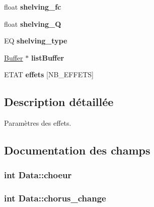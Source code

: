 \begin{DoxyCompactItemize}
\item 
float {\bfseries shelving\+\_\+fc}\hypertarget{structData_acc41c5321d720af7ef090304d57bebbe}{}\label{structData_acc41c5321d720af7ef090304d57bebbe}

\item 
float {\bfseries shelving\+\_\+Q}\hypertarget{structData_a94dc3fd1f3e36f82829b924f50635261}{}\label{structData_a94dc3fd1f3e36f82829b924f50635261}

\item 
EQ {\bfseries shelving\+\_\+type}\hypertarget{structData_afa24b396e1bab1c62d9f907f612d84e5}{}\label{structData_afa24b396e1bab1c62d9f907f612d84e5}

\item 
\hyperlink{structBuffer}{Buffer} $\ast$ {\bfseries list\+Buffer}\hypertarget{structData_ad8144307f2fe566d717719a07ae3fd36}{}\label{structData_ad8144307f2fe566d717719a07ae3fd36}

\item 
E\+T\+AT {\bfseries effets} \mbox{[}N\+B\+\_\+\+E\+F\+F\+E\+TS\mbox{]}\hypertarget{structData_aec895ebeebd83409b566dbab730e38d2}{}\label{structData_aec895ebeebd83409b566dbab730e38d2}

\end{DoxyCompactItemize}


\subsection{Description détaillée}
Paramètres des effets. 

\subsection{Documentation des champs}
\subsubsection[{\texorpdfstring{choeur}{choeur}}]{\setlength{\rightskip}{0pt plus 5cm}int Data\+::choeur}\hypertarget{structData_abeda9313a40d5d26d05c8d5be57729ff}{}\label{structData_abeda9313a40d5d26d05c8d5be57729ff}
\subsubsection[{\texorpdfstring{chorus\+\_\+change}{chorus_change}}]{\setlength{\rightskip}{0pt plus 5cm}int Data\+::chorus\+\_\+change}\hypertarget{structData_af2221f9b7ee9a4956c49e2f4082bf77c}{}\label{structData_af2221f9b7ee9a4956c49e2f4082bf77c}
